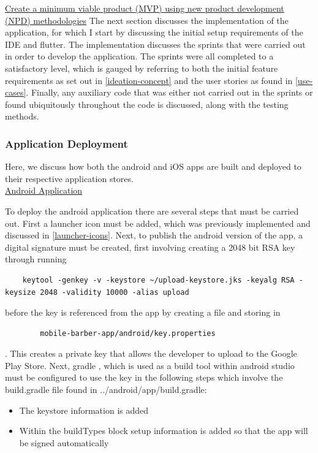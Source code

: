 \documentclass[12pt]{article}
\begin{document}
	\noindent
	\underline{Create a minimum viable product (MVP) using new product development}
	\\
	\underline{(NPD) methodologies} 
	\newline
	The next section discusses the implementation of the application, for which I start by discussing the initial setup requirements of the IDE and flutter. The implementation discusses the sprints that were carried out in order to develop the application. The sprints were all completed to a satisfactory level, which is gauged by referring to both the initial feature requirements as set out in \autoref{ideation-concept} and the user stories as found in \autoref{use-cases}. Finally, any auxiliary code that was either not carried out in the sprints or found ubiquitously throughout the code is discussed, along with the testing methods.
	
	\subsubsection{Application Deployment}
	Here, we discuss how both the android and iOS apps are built and deployed to their respective application stores.
	\\
	
	\noindent
	\underline{Android Application}
	
	\noindent
	To deploy the android application there are several steps that must be carried out. First a launcher icon must be added, which was previously implemented and discussed in \autoref{launcher-icons}. Next, to publish the android version of the app, a digital signature must be created, first involving creating a 2048 bit RSA key through running 
	\begin{lstlisting}
	keytool -genkey -v -keystore ~/upload-keystore.jks -keyalg RSA -keysize 2048 -validity 10000 -alias upload
	\end{lstlisting}
	before the key is referenced from the app by creating a file and storing in 
	\begin{lstlisting}
		mobile-barber-app/android/key.properties
	\end{lstlisting}.
	This creates a private key that allows the developer to upload to the Google Play Store.
	Next, gradle \cite{androidAndroidGradlePlugin2021}, which is used as a build tool within android studio must be configured to use the key in the following steps which involve the build.gradle file found in ../android/app/build.gradle: 
	\begin{itemize}
		\item The keystore information is added
		\item Within the buildTypes block setup information is added so that the app will be signed automatically
	\end{itemize}
\end{document}
